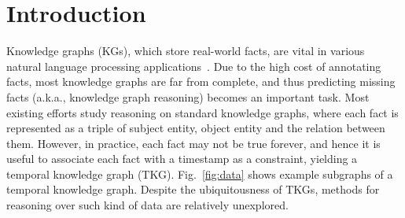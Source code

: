 \documentclass[11pt,a4paper]{article}
\newcommand{\method}{\textsc{RE-Net}\xspace}
\begin{document}
\begin{abstract}

%



\end{abstract}


\section{Introduction}




Knowledge graphs (KGs), which store real-world facts, are vital in various natural language processing applications~\cite{Bordes2013TranslatingEF,Schlichtkrull2018ModelingRD,kazemi2019relational}. Due to the high cost of annotating facts, most knowledge graphs are far from complete, and thus predicting missing facts (a.k.a., knowledge graph reasoning) becomes an important task. Most existing efforts study reasoning on standard knowledge graphs, where each fact is represented as a triple of subject entity, object entity and the relation between them. However, in practice, each fact may not be true forever, and hence it is useful to associate each fact with a timestamp as a constraint, yielding a temporal knowledge graph (TKG). Fig.~\ref{fig:data} shows example subgraphs of a temporal knowledge graph. Despite the ubiquitousness of TKGs, methods for reasoning over such kind of data are relatively unexplored.
\end{document}
